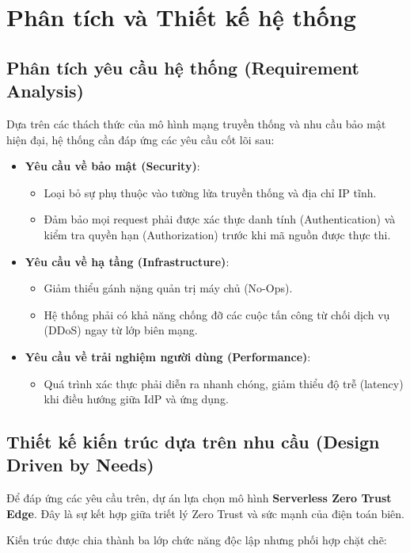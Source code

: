 
\section{Phân tích và Thiết kế hệ thống}

\subsection{Phân tích yêu cầu hệ thống (Requirement Analysis)}
Dựa trên các thách thức của mô hình mạng truyền thống và nhu cầu bảo mật hiện đại, hệ thống cần đáp ứng các yêu cầu cốt lõi sau:

\begin{itemize}
\item \textbf{Yêu cầu về bảo mật (Security)}:
\begin{itemize}
\item Loại bỏ sự phụ thuộc vào tường lửa truyền thống và địa chỉ IP tĩnh.
\item Đảm bảo mọi request phải được xác thực danh tính (Authentication) và kiểm tra quyền hạn (Authorization) trước khi mã nguồn được thực thi.
\end{itemize}
\item \textbf{Yêu cầu về hạ tầng (Infrastructure)}:
\begin{itemize}
\item Giảm thiểu gánh nặng quản trị máy chủ (No-Ops).
\item Hệ thống phải có khả năng chống đỡ các cuộc tấn công từ chối dịch vụ (DDoS) ngay từ lớp biên mạng.
\end{itemize}
\item \textbf{Yêu cầu về trải nghiệm người dùng (Performance)}:
\begin{itemize}
\item Quá trình xác thực phải diễn ra nhanh chóng, giảm thiểu độ trễ (latency) khi điều hướng giữa IdP và ứng dụng.
\end{itemize}
\end{itemize}

\subsection{Thiết kế kiến trúc dựa trên nhu cầu (Design Driven by Needs)}
Để đáp ứng các yêu cầu trên, dự án lựa chọn mô hình \textbf{Serverless Zero Trust Edge}. Đây là sự kết hợp giữa triết lý Zero Trust và sức mạnh của điện toán biên.

Kiến trúc được chia thành ba lớp chức năng độc lập nhưng phối hợp chặt chẽ:

